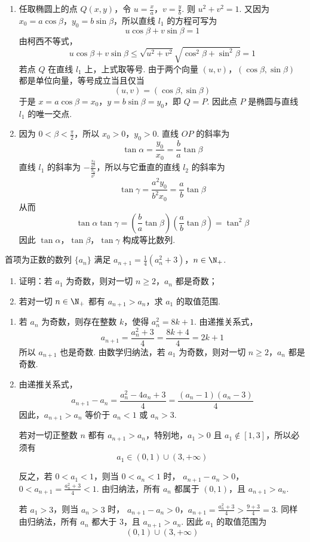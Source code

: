 \begin{solution}
\begin{enumerate}
\item 任取椭圆上的点 \(Q(x,y)\)，令 \(u=\frac{x}{a}\)，\(v=\frac{y}{b}\). 则 \(u^{2}+v^{2}=1\). 又因为 \(x_{0}=a\cos\beta\)，\(y_{0}=b\sin\beta\)，所以直线 \(l_{1}\) 的方程可写为
\[
u\cos\beta+v\sin\beta=1
\]
由柯西不等式，
\[
u\cos\beta+v\sin\beta
\leqslant\sqrt{u^{2}+v^{2}}\sqrt{\cos^{2}\beta+\sin^{2}\beta}=1
\]
若点 \(Q\) 在直线 \(l_{1}\) 上，上式取等号. 由于两个向量 \((u,v)\)，\((\cos\beta,\sin\beta)\) 都是单位向量，等号成立当且仅当
\[
(u,v)=(\cos\beta,\sin\beta)
\]
于是 \(x=a\cos\beta=x_{0}\)，\(y=b\sin\beta=y_{0}\)，即 \(Q=P\). 因此点 \(P\) 是椭圆与直线 \(l_{1}\) 的唯一交点.
\item 因为 \(0<\beta<\frac{\pi}{2}\)，所以 \(x_{0}>0\)，\(y_{0}>0\). 直线 \(OP\) 的斜率为
\[
\tan\alpha=\frac{y_{0}}{x_{0}}=\frac{b}{a}\tan\beta
\]
直线 \(l_{1}\) 的斜率为 \(-\frac{\frac{x_{0}}{a^{2}}}{\frac{y_{0}}{b^{2}}}\)，所以与它垂直的直线 \(l_{2}\) 的斜率为
\[
\tan\gamma=\frac{a^{2}y_{0}}{b^{2}x_{0}}=\frac{a}{b}\tan\beta
\]
从而
\[
\tan\alpha\tan\gamma=\left(\frac{b}{a}\tan\beta\right)\left(\frac{a}{b}\tan\beta\right)=\tan^{2}\beta
\]
因此 \(\tan\alpha\)，\(\tan\beta\)，\(\tan\gamma\) 构成等比数列.
\end{enumerate}
\end{solution}

\begin{problem}
首项为正数的数列 \(\{a_n\}\) 满足 \(a_{n + 1} = \frac{1}{4} (a_n^2 + 3)\)，\(n\in \N_+\).

\begin{enumerate}
\item 证明：若 \(a_1\) 为奇数，则对一切 \(n \geqslant 2\)，\(a_n\) 都是奇数；
\item 若对一切 \(n \in \N_+\) 都有 \(a_{n+1} > a_n\)，求 \(a_1\) 的取值范围.
\end{enumerate}
\end{problem}

\begin{solution}
\begin{enumerate}
\item 若 \(a_n\) 为奇数，则存在整数 \(k\)，使得 \(a_n^{2}=8k+1\). 由递推关系式，
\[
a_{n+1}=\frac{a_n^{2}+3}{4}=\frac{8k+4}{4}=2k+1
\]
所以 \(a_{n+1}\) 也是奇数. 由数学归纳法，若 \(a_1\) 为奇数，则对一切 \(n\geqslant2\)，\(a_n\) 都是奇数.
\item 由递推关系式，
\[
a_{n+1}-a_n=\frac{a_n^{2}-4a_n+3}{4}=\frac{(a_n-1)(a_n-3)}{4}
\]
因此，\(a_{n+1}>a_n\) 等价于 \(a_n<1\) 或 \(a_n>3\).

若对一切正整数 \(n\) 都有 \(a_{n+1}>a_n\)，特别地，\(a_1>0\) 且 \(a_1\notin[1,3]\)，所以必须有
\[
a_1\in(0,1)\cup(3,+\infty)
\]

反之，若 \(0<a_1<1\)，则当 \(0<a_n<1\) 时，
\(a_{n+1}-a_n>0\)，\(0<a_{n+1}=\frac{a_n^{2}+3}{4}<1\).
由归纳法，所有 \(a_n\) 都属于 \((0,1)\)，且 \(a_{n+1}>a_n\).

若 \(a_1>3\)，则当 \(a_n>3\) 时，
\(a_{n+1}-a_n>0\)，\(a_{n+1}=\frac{a_n^{2}+3}{4}>\frac{9+3}{4}=3\).
同样由归纳法，所有 \(a_n\) 都大于 \(3\)，且 \(a_{n+1}>a_n\). 因此 \(a_1\) 的取值范围为
\[
\boxed{(0,1)\cup(3,+\infty)}
\]
\end{enumerate}
\end{solution}
